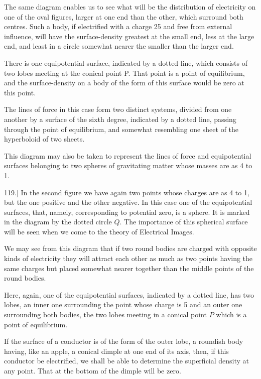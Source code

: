 \documentclass[11pt,a4paper]{article}
\begin{document}
The same diagram enables us to see what will be the distribution of electricity on one of the oval figures, larger at one end than the other, which surround both centres. Such a body, if electrified with a charge 25 and free from external influence, will have the surface-density greatest at the small end, less at the large end, and least in a circle somewhat nearer the smaller than the larger end.

There is one equipotential surface, indicated by a dotted line, which consists of two lobes meeting at the conical point P. That point is a point of equilibrium, and the surface-density on a body of the form of this surface would be zero at this point.

The lines of force in this case form two distinct systems, divided from one another by a surface of the sixth degree, indicated by a dotted line, passing through the point of equilibrium, and somewhat resembling one sheet of the hyperboloid of two sheets.

This diagram may also be taken to represent the lines of force and equipotential surfaces belonging to two spheres of gravitating matter whose masses are as 4 to 1.

119.] In the second figure we have again two points whose charges are as 4 to 1, but the one positive and the other negative. In this case one of the equipotential surfaces, that, namely, corresponding to potential zero, is a sphere. It is marked in the diagram by the dotted circle $Q$. The importance of this spherical surface will be seen when we come to the theory of Electrical Images.

We may see from this diagram that if two round bodies are charged with opposite kinds of electricity they will attract each other as much as two points having the same charges but placed somewhat nearer together than the middle points of the round bodies.

Here, again, one of the equipotential surfaces, indicated by a dotted line, has two lobes, an inner one surrounding the point whose charge is 5 and an outer one surrounding both bodies, the two lobes meeting in a conical point $P$ which is a point of equilibrium.

If the surface of a conductor is of the form of the outer lobe, a roundish body having, like an apple, a conical dimple at one end of its axis, then, if this conductor be electrified, we shall be able to determine the superficial density at any point. That at the bottom of the dimple will be zero.
\end{document}
